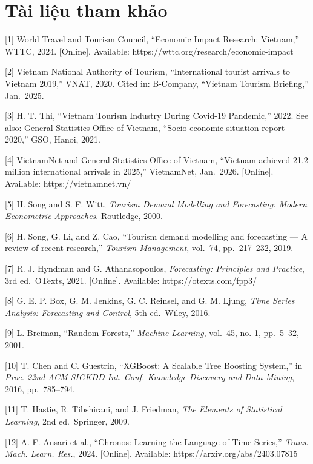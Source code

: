 \documentclass[
]{article}
\begin{document}
\newpage

\section{Tài liệu tham khảo}\label{tuxe0i-liux1ec7u-tham-khux1ea3o}

{[}1{]} World Travel and Tourism Council, ``Economic Impact Research:
Vietnam,'' WTTC, 2024. {[}Online{]}. Available:
https://wttc.org/research/economic-impact

{[}2{]} Vietnam National Authority of Tourism, ``International tourist
arrivals to Vietnam 2019,'' VNAT, 2020. Cited in: B-Company, ``Vietnam
Tourism Briefing,'' Jan.~2025.

{[}3{]} H. T. Thi, ``Vietnam Tourism Industry During Covid-19
Pandemic,'' 2022. See also: General Statistics Office of Vietnam,
``Socio-economic situation report 2020,'' GSO, Hanoi, 2021.

{[}4{]} VietnamNet and General Statistics Office of Vietnam, ``Vietnam
achieved 21.2 million international arrivals in 2025,'' VietnamNet,
Jan.~2026. {[}Online{]}. Available: https://vietnamnet.vn/

{[}5{]} H. Song and S. F. Witt, \emph{Tourism Demand Modelling and
Forecasting: Modern Econometric Approaches}. Routledge, 2000.

{[}6{]} H. Song, G. Li, and Z. Cao, ``Tourism demand modelling and
forecasting --- A review of recent research,'' \emph{Tourism
Management}, vol.~74, pp.~217--232, 2019.

{[}7{]} R. J. Hyndman and G. Athanasopoulos, \emph{Forecasting:
Principles and Practice}, 3rd ed.~OTexts, 2021. {[}Online{]}. Available:
https://otexts.com/fpp3/

{[}8{]} G. E. P. Box, G. M. Jenkins, G. C. Reinsel, and G. M. Ljung,
\emph{Time Series Analysis: Forecasting and Control}, 5th ed.~Wiley,
2016.

{[}9{]} L. Breiman, ``Random Forests,'' \emph{Machine Learning},
vol.~45, no. 1, pp.~5--32, 2001.

{[}10{]} T. Chen and C. Guestrin, ``XGBoost: A Scalable Tree Boosting
System,'' in \emph{Proc. 22nd ACM SIGKDD Int. Conf. Knowledge Discovery
and Data Mining}, 2016, pp.~785--794.

{[}11{]} T. Hastie, R. Tibshirani, and J. Friedman, \emph{The Elements
of Statistical Learning}, 2nd ed.~Springer, 2009.

{[}12{]} A. F. Ansari et al., ``Chronos: Learning the Language of Time
Series,'' \emph{Trans. Mach. Learn. Res.}, 2024. {[}Online{]}.
Available: https://arxiv.org/abs/2403.07815
\end{document}

